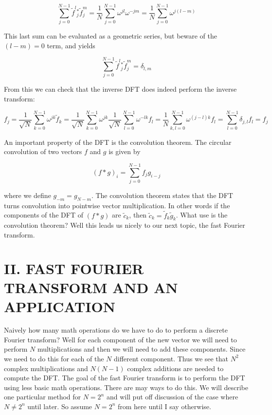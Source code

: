 \documentclass[10pt]{article}
\begin{document}
\begin{equation*}
\sum_{j=0}^{N-1} \tilde{f}^{l}{ }_{j}^{*} \tilde{f}_{j}^{m}=\frac{1}{N} \sum_{j=0}^{N-1} \omega^{j l} \omega^{-j m}=\frac{1}{N} \sum_{j=0}^{N-1} \omega^{j(l-m)} \tag{4}
\end{equation*}


This last sum can be evaluated as a geometric series, but beware of the $(l-m)=0$ term, and yields


\begin{equation*}
\sum_{j=0}^{N-1} \tilde{f}^{l}{ }_{j}^{*} \tilde{f}_{j}^{m}=\delta_{l, m} \tag{5}
\end{equation*}


From this we can check that the inverse DFT does indeed perform the inverse transform:


\begin{equation*}
f_{j}=\frac{1}{\sqrt{N}} \sum_{k=0}^{N-1} \omega^{j k} \tilde{f}_{k}=\frac{1}{\sqrt{N}} \sum_{k=0}^{N-1} \omega^{j k} \frac{1}{\sqrt{N}} \sum_{l=0}^{N-1} \omega^{-l k} f_{l}=\frac{1}{N} \sum_{k, l=0}^{N-1} \omega^{(j-l) k} f_{l}=\sum_{l=0}^{N-1} \delta_{j, l} f_{l}=f_{j} \tag{6}
\end{equation*}


An important property of the DFT is the convolution theorem. The circular convolution of two vectors $f$ and $g$ is given by


\begin{equation*}
(f * g)_{i}=\sum_{j=0}^{N-1} f_{j} g_{i-j} \tag{7}
\end{equation*}


where we define $g_{-m}=g_{N-m}$. The convolution theorem states that the DFT turns convolution into pointwise vector multiplication. In other words if the components of the DFT of $(f * g)$ are $\tilde{c}_{k}$, then $\tilde{c}_{k}=\tilde{f}_{k} \tilde{g}_{k}$. What use is the convolution theorem? Well this leads us nicely to our next topic, the fast Fourier transform.

\section*{II. FAST FOURIER TRANSFORM AND AN APPLICATION}
Naively how many math operations do we have to do to perform a discrete Fourier transform? Well for each component of the new vector we will need to perform $N$ multiplications and then we will need to add these components. Since we need to do this for each of the $N$ different component. Thus we see that $N^{2}$ complex multiplications and $N(N-1)$ complex additions are needed to compute the DFT. The goal of the fast Fourier transform is to perform the DFT using less basic math operations. There are may ways to do this. We will describe one particular method for $N=2^{n}$ and will put off discussion of the case where $N \neq 2^{n}$ until later. So assume $N=2^{n}$ from here until I say otherwise.
\end{document}
